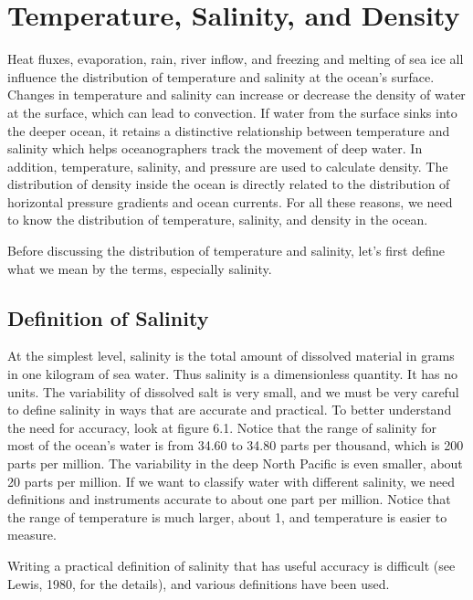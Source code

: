 \chapter{Temperature, Salinity, and Density}
Heat fluxes, evaporation, rain, river inflow, and freezing and melting of sea
ice all influence the distribution of temperature and salinity at the ocean's
surface. Changes in temperature and salinity can increase or decrease the density
of water at the surface, which can lead to convection. If water from the
surface sinks into the deeper ocean, it retains a distinctive relationship between
temperature and salinity which helps oceanographers track the movement of deep
water. In addition, temperature, salinity, and pressure are used to calculate
density. The distribution of density inside the ocean is directly related to the
distribution of horizontal pressure gradients and ocean currents.  For all these
reasons, we need to know the distribution of temperature, salinity, and density in
the ocean.

Before discussing the distribution of temperature and salinity, let's first define
what we mean by the terms, especially salinity.

\section{Definition of Salinity}
At the simplest level, salinity is the total
amount of dissolved material in grams in one kilogram of sea
water. Thus salinity is a dimensionless quantity. It has no units. The
variability of dissolved salt is very small, and we must be very
careful to define salinity in ways that are accurate and practical. To
better understand the need for accuracy, look
at figure 6.1. Notice that the range of salinity for most of the
ocean's water is from 34.60 to 34.80 parts per thousand, which is 200
parts per million. The variability in the deep North Pacific is even
smaller, about 20 parts per million. If we want to classify water with
different salinity, we need definitions and instruments accurate to
about one part per million. Notice that the range of temperature is
much larger, about 1, and temperature is easier to measure.

Writing a practical definition of salinity that has useful accuracy is
difficult (see Lewis, 1980, for the details), and various definitions
have been used.\\

